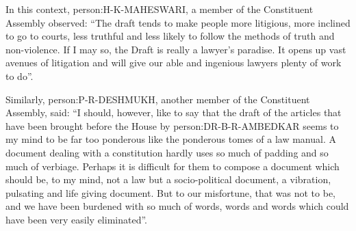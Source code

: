 In this context, \gls{person:H-K-MAHESWARI}, a member of the Constituent Assembly observed: ``The draft tends to make people more litigious, more inclined to go to courts, less truthful and less likely to follow the methods of truth and non-violence. If I may so, the Draft is really a lawyer's paradise. It opens up vast avenues of litigation and will give our able and ingenious lawyers plenty of work to do''.

Similarly, \gls{person:P-R-DESHMUKH}, another member of the Constituent Assembly, said: ``I should, however, like to say that the draft of the articles that have been brought before the House by \gls{person:DR-B-R-AMBEDKAR} seems to my mind to be far too ponderous like the ponderous tomes of a law manual. A document dealing with a constitution hardly uses so much of padding and so much of verbiage. Perhaps it is difficult for them to compose a document which should be, to my mind, not a law but a socio-political document, a vibration, pulsating and life giving document. But to our misfortune, that was not to be, and we have been burdened with so much of words, words and words which could have been very easily eliminated''.

\clearpage

\onecolumn

